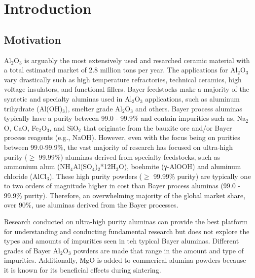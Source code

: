 \chapter{Introduction} \label{chapter1:introduction}

\section{Motivation}
Al$_{2}$O$_{3}$ is arguably the most extensively used and resarched ceramic material with a total estimated market of 2.8 million tons per year.  The applications for Al$_{2}$O$_{3}$ vary drastically such as high temperature refractories, technical ceramics, high voltage insulators, and functional fillers. Bayer feedstocks make a majority of the syntetic and specialty aluminas used in Al$_{2}$O$_{3}$ applications, such as aluminum trihydrate (Al(OH)$_{3}$), smelter grade Al$_{2}$O$_{3}$ and others. Bayer process aluminas typically have a purity between 99.0 - 99.9\% and contain impurities such as, Na$_{2}$O, CaO, Fe$_{2}$O$_{3}$, and SiO$_{2}$ that originate from the bauxite ore and/or Bayer process reagents (e.g., NaOH). However, even with the focus being on purities between 99.0-99.9\%, the vast majority of research has focused on ultra-high purity ($\geq$ 99.99\%) aluminas derived from specialty feedstocks, such as ammonium alum (NH$_{4}$Al(SO$_{4}$)$_{2}$*12H$_{2}$O), boehmite (γ-AlOOH) and aluminum chloride (AlCl$_{3}$). These high purity powders ($\geq$ 99.99\% purity) are typically one to two orders of magnitude higher in cost than Bayer process aluminas (99.0 - 99.9\% purity). Therefore, an overwhelming majority of the global market share, over 90\%, use aluminas derived from the Bayer processes.

Research conducted on ultra-high purity aluminas can provide the best platform for understanding and conducting fundamental research but does not explore the types and amounts of impurities seen in teh typical Bayer aluminas. Different grades of Bayer Al$_{2}$O$_{3}$ powders are made that range in the amount and type of impurities. Additionally, MgO is added to commerical alumina powders because it is known for its beneficial effects during sintering. 

